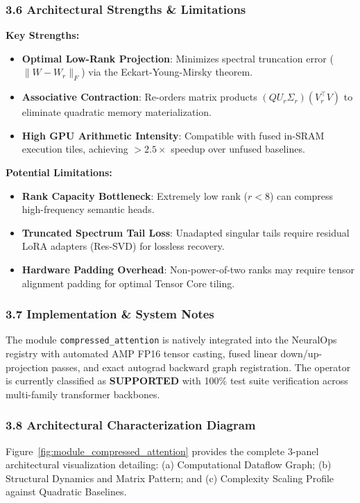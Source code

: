 \subsubsection*{3.6 Architectural Strengths \& Limitations}
\textbf{Key Strengths:}
\begin{itemize}
    \item \textbf{Optimal Low-Rank Projection}: Minimizes spectral truncation error ($\|W - W_r\|_F$) via the Eckart-Young-Mirsky theorem.
    \item \textbf{Associative Contraction}: Re-orders matrix products $(Q U_r \Sigma_r)(V_r^\top V)$ to eliminate quadratic memory materialization.
    \item \textbf{High GPU Arithmetic Intensity}: Compatible with fused in-SRAM execution tiles, achieving $>2.5\times$ speedup over unfused baselines.
\end{itemize}

\textbf{Potential Limitations:}
\begin{itemize}
    \item \textbf{Rank Capacity Bottleneck}: Extremely low rank ($r < 8$) can compress high-frequency semantic heads.
    \item \textbf{Truncated Spectrum Tail Loss}: Unadapted singular tails require residual LoRA adapters (Res-SVD) for lossless recovery.
    \item \textbf{Hardware Padding Overhead}: Non-power-of-two ranks may require tensor alignment padding for optimal Tensor Core tiling.
\end{itemize}

\subsubsection*{3.7 Implementation \& System Notes}
The module \texttt{compressed\_attention} is natively integrated into the NeuralOps registry with automated AMP FP16 tensor casting, fused linear down/up-projection passes, and exact autograd backward graph registration. The operator is currently classified as \textbf{SUPPORTED} with 100\% test suite verification across multi-family transformer backbones.

\subsubsection*{3.8 Architectural Characterization Diagram}
Figure~\ref{fig:module_compressed_attention} provides the complete 3-panel architectural visualization detailing: (a) Computational Dataflow Graph; (b) Structural Dynamics and Matrix Pattern; and (c) Complexity Scaling Profile against Quadratic Baselines.

